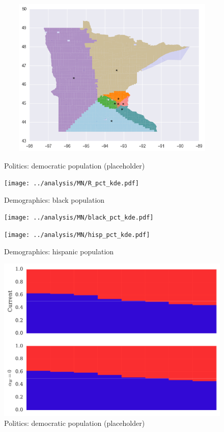 \begin{figure}[htb!]
\includegraphics[width=5in,height=3in,keepaspectratio]{../maps/MN/static/0_25_after.png}
\end{figure}

\clearpage
\newpage

\begin{figure}[htb!] \centering
\caption{ Politics: democratic population (placeholder)}
\texttt{[image: ../analysis/MN/R\_pct\_kde.pdf]}
\caption{ Demographics: black population }
\texttt{[image: ../analysis/MN/black\_pct\_kde.pdf]}
\caption{ Demographics: hispanic population }
\texttt{[image: ../analysis/MN/hisp\_pct\_kde.pdf]}
\end{figure}

\clearpage
\newpage

\begin{figure}[htb!] \centering
\caption{ Politics: democratic population (placeholder)}
\includegraphics[width=6in]{../analysis/MN/barplot.pdf}
\end{figure}

